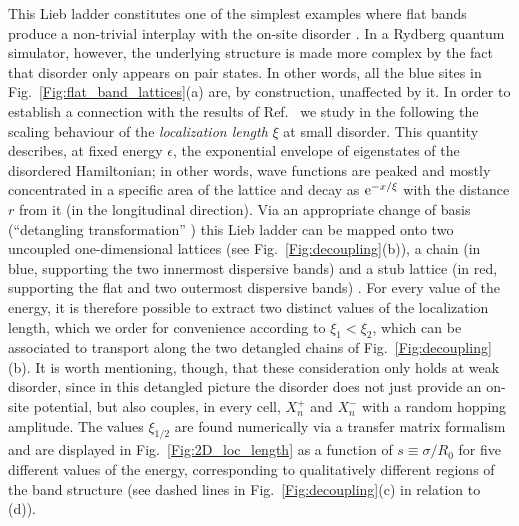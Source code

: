 \documentclass[prl,aps,twocolumn,showpacs,superscriptaddress,longbibliography]{revtex4-1}
\newcommand{\rme}[1]{{\rm{e}}^{#1}}
\begin{document}
This Lieb ladder constitutes one of the simplest examples where flat bands produce a non-trivial interplay with the on-site disorder \cite{Leykam2017}. In a Rydberg quantum simulator, however, the underlying structure is made more complex by the fact that disorder only appears on pair states. In other words, all the blue sites in Fig.~\ref{Fig:flat_band_lattices}(a) are, by construction, unaffected by it.
In order to establish a connection with the results of Ref.~\cite{Leykam2017} we study in the following the scaling behaviour of the \emph{localization length} $\xi$ at small disorder. 
This quantity describes, at fixed energy $\epsilon$, the exponential envelope of eigenstates of the disordered Hamiltonian; in other words, wave functions are peaked and mostly concentrated in a specific area of the lattice and decay as $\rme{-x/\xi}$ with the distance $r$ from it (in the longitudinal direction).
%
Via an appropriate change of basis (``detangling transformation'' \cite{a_Flach_EPL_14,Leykam2017}) this Lieb ladder can be mapped onto two uncoupled one-dimensional lattices (see Fig.~\ref{Fig:decoupling}(b)), a chain (in blue, supporting the two innermost dispersive bands) and a stub lattice (in red, supporting the flat and two outermost dispersive bands) \cite{SM}.
%
For every value of the energy, it is therefore possible to extract two distinct values of the localization length, which we order for convenience according to $\xi_1 < \xi_2$, which can be associated to transport along the two detangled chains of Fig.~\ref{Fig:decoupling}(b). It is worth mentioning, though, that these consideration only holds at weak disorder, since in this detangled picture the disorder does not just provide an on-site potential, but also couples, in every cell, $X^{+}_n$ and $X^{-}_n$ with a random hopping amplitude. The values $\xi_{1/2}$ are found numerically via a transfer matrix formalism and are displayed in Fig.~\ref{Fig:2D_loc_length} as a function of $s \equiv \sigma / R_0$ for five different values of the energy, corresponding to qualitatively different regions of the band structure (see dashed lines in Fig.~\ref{Fig:decoupling}(c) in relation to (d)).
\end{document}
